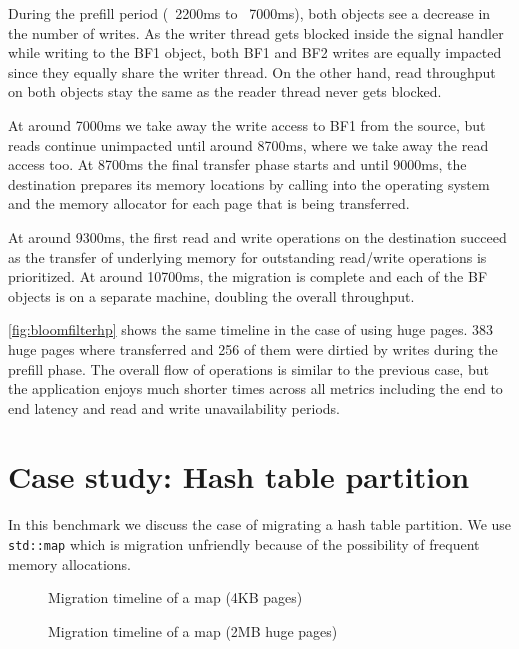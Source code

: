 During the prefill period (~2200ms to ~7000ms), both objects see a decrease in
the number of writes. As the writer thread gets blocked inside the signal
handler while writing to the BF1 object, both BF1 and BF2 writes are equally
impacted since they equally share the writer thread. On the other hand, read
throughput on both objects stay the same as the reader thread never gets
blocked.

At around 7000ms we take away the write access to BF1 from the source, but
reads continue unimpacted until around 8700ms, where we take away the read
access too. At 8700ms the final transfer phase starts and until 9000ms,
the destination prepares its memory locations by calling into the operating
system and the memory allocator for each page that is being transferred.

At around 9300ms, the first read and write operations on the destination
succeed as the transfer of underlying memory for outstanding read/write
operations is prioritized. At around 10700ms, the migration is complete and
each of the BF objects is on a separate machine, doubling the overall
throughput.


\autoref{fig:bloomfilterhp} shows the same timeline in the case of using
huge pages. 383 huge pages where transferred and 256 of them were dirtied
by writes during the prefill phase. The overall flow of operations is similar
to the previous case, but
the application enjoys much shorter times across all metrics including the
end to end latency and read and write unavailability periods.

\section{Case study: Hash table partition}
\label{sec:evalgenericobj}
In this benchmark we discuss the case of migrating a hash table partition. We
use \texttt{std::map} which is migration unfriendly because of the possibility
of frequent memory allocations.


\begin{figure}[tp]
    \begin{center}
        
    \end{center}
    \caption{Migration timeline of a map (4KB pages)}
    \label{fig:map}
\end{figure}

\begin{figure}[tp]
    \begin{center}
        
    \end{center}
    \caption{Migration timeline of a map (2MB huge pages)}
    \label{fig:maphp}
\end{figure}



